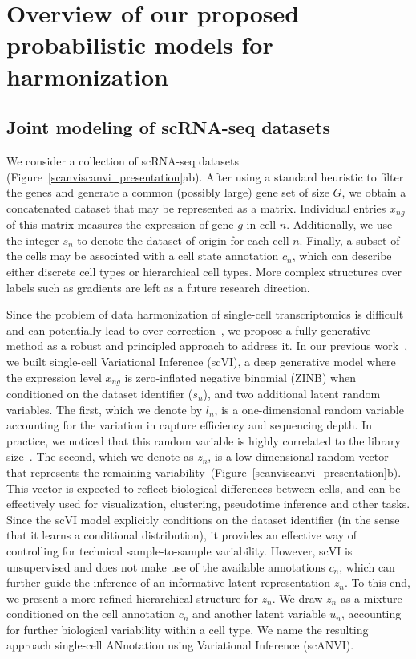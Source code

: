 \section{Overview of our proposed probabilistic models for harmonization}

\subsection{Joint modeling of scRNA-seq datasets}
We consider a collection of scRNA-seq datasets (Figure~\ref{scanviscanvi_presentation}ab). After using a standard heuristic to filter the genes and generate a common (possibly large) gene set of size $G$, we obtain a concatenated dataset that may be represented as a matrix. Individual entries $x_{ng}$ of this matrix measures the expression of gene $g$ in cell $n$. Additionally, we use the integer $s_n$ to denote the dataset of origin for each cell $n$. Finally, a subset of the cells may be associated with a cell state annotation $c_n$, which can describe either discrete cell types or hierarchical cell types. More complex structures over labels such as gradients are left as a future research direction. 

Since the problem of data harmonization of single-cell transcriptomics is difficult and can potentially lead to over-correction~\cite{batchfalsede}, we propose a fully-generative method as a robust and principled approach to address it. In our previous work~\cite{scvi}, we built single-cell Variational Inference (scVI), a deep generative model where the expression level $x_{ng}$ is zero-inflated negative binomial (ZINB) when conditioned on the dataset identifier ($s_n$), and two additional latent random variables. The first, which we denote by $l_n$, is a one-dimensional random variable accounting for the variation in capture efficiency and sequencing depth. In practice, we noticed that this random variable is highly correlated to the library size~\cite{scvi}. The second, which we denote as $z_n$, is a low dimensional random vector that represents the remaining variability~(Figure~\ref{scanviscanvi_presentation}b). This vector is expected to reflect biological differences between cells, and can be effectively used for visualization, clustering, pseudotime inference and other tasks. Since the scVI model explicitly conditions on the dataset identifier (in the sense that it learns a conditional distribution), it provides an effective way of controlling for technical sample-to-sample variability. However, scVI is unsupervised and does not make use of the available annotations $c_n$, which can further guide the inference of an informative latent representation $z_n$. To this end, we present a more refined hierarchical structure for $z_n$. We draw $z_n$ as a mixture conditioned on the cell annotation $c_n$ and another latent variable $u_n$, accounting for further biological variability within a cell type. We name the resulting approach single-cell ANnotation using Variational Inference (scANVI). 

